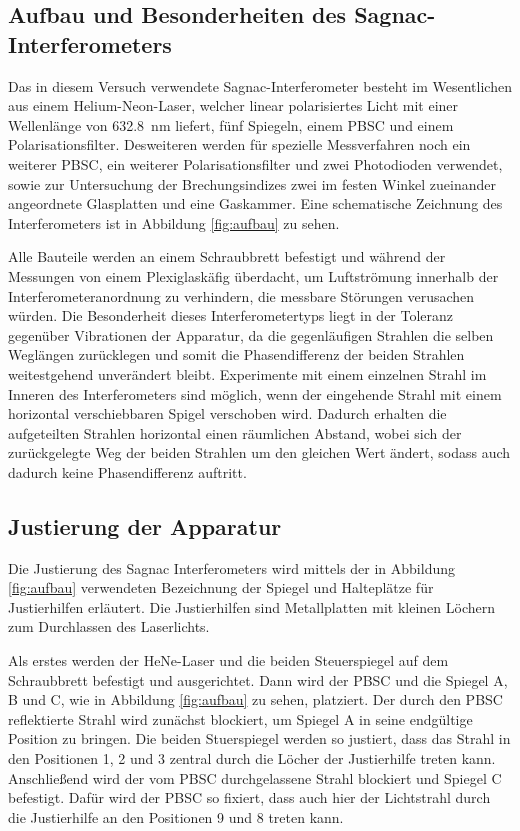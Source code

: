 \subsection{Aufbau und Besonderheiten des Sagnac-Interferometers}
Das in diesem Versuch verwendete Sagnac-Interferometer besteht im Wesentlichen aus einem Helium-Neon-Laser, welcher linear polarisiertes Licht mit einer Wellenlänge von \SI{632.8}{\nano\metre} liefert, fünf Spiegeln, einem PBSC und einem Polarisationsfilter. Desweiteren werden für spezielle Messverfahren noch ein weiterer PBSC, ein weiterer Polarisationsfilter und zwei Photodioden verwendet, sowie zur Untersuchung der Brechungsindizes zwei im festen Winkel zueinander angeordnete Glasplatten und eine Gaskammer. Eine schematische Zeichnung des Interferometers ist in Abbildung \ref{fig:aufbau} zu sehen.

Alle Bauteile werden an einem Schraubbrett befestigt und während der Messungen von einem Plexiglaskäfig überdacht, um Luftströmung innerhalb der Interferometeranordnung zu verhindern, die messbare Störungen verusachen würden. Die Besonderheit dieses Interferometertyps liegt in der Toleranz gegenüber Vibrationen der Apparatur, da die gegenläufigen Strahlen die selben Weglängen zurücklegen und somit die Phasendifferenz der beiden Strahlen weitestgehend unverändert bleibt. Experimente mit einem einzelnen Strahl im Inneren des Interferometers sind möglich, wenn der eingehende Strahl mit einem horizontal verschiebbaren Spigel verschoben wird. Dadurch erhalten die aufgeteilten Strahlen horizontal einen räumlichen Abstand, wobei sich der zurückgelegte Weg der beiden Strahlen um den gleichen Wert ändert, sodass auch dadurch keine Phasendifferenz auftritt.

\subsection{Justierung der Apparatur}
Die Justierung des Sagnac Interferometers wird mittels der in Abbildung \ref{fig:aufbau} verwendeten Bezeichnung der Spiegel und Halteplätze für Justierhilfen erläutert. Die Justierhilfen
sind Metallplatten mit kleinen Löchern zum Durchlassen des Laserlichts.

Als erstes werden der HeNe-Laser und die beiden Steuerspiegel auf dem Schraubbrett befestigt und ausgerichtet. Dann wird der PBSC und die Spiegel A, B und C, wie in Abbildung \ref{fig:aufbau} zu sehen, platziert. Der durch den PBSC reflektierte Strahl wird zunächst blockiert, um Spiegel A in seine endgültige Position zu bringen. Die beiden Stuerspiegel werden so justiert, dass das Strahl in den Positionen 1, 2 und 3 zentral durch die Löcher der Justierhilfe treten kann. Anschließend wird der vom PBSC durchgelassene Strahl blockiert und Spiegel C befestigt. Dafür wird der PBSC so fixiert, dass auch hier der Lichtstrahl durch die Justierhilfe an den Positionen 9 und 8 treten kann.

